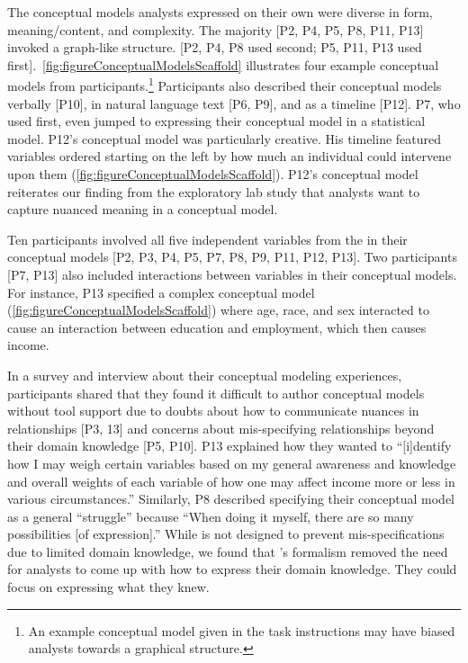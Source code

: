 The conceptual models analysts expressed on their own were diverse in form,
meaning/content, and complexity. The majority [P2, P4, P5, P8, P11, P13] invoked
a graph-like structure. [P2, P4, P8 used \rTisane second; P5, P11, P13 used
\rTisane first].~\autoref{fig:figureConceptualModelsScaffold} illustrates four example conceptual
models from participants.\footnote{An example conceptual model given in the task instructions may
have biased analysts towards a graphical structure.} Participants also described
their conceptual models verbally [P10], in natural language text [P6, P9], and
as a timeline [P12]. P7, who used \rTisane first, even jumped to expressing
their conceptual model in a statistical model. P12's conceptual model was
particularly creative. His timeline featured variables ordered starting on the
left by how much an individual could intervene upon them (\autoref{fig:figureConceptualModelsScaffold}). P12's conceptual model reiterates our finding from the exploratory lab
study that analysts want to capture nuanced meaning in a conceptual model. 

Ten participants involved all five independent variables from the \dataSet in
their conceptual models [P2, P3, P4, P5, P7, P8, P9, P11, P12, P13]. Two
participants [P7, P13] also included interactions between variables in their
conceptual models. For instance, P13 specified a complex conceptual model
(\autoref{fig:figureConceptualModelsScaffold}) where age, race, and sex interacted to cause an
interaction between education and employment, which then causes income.

In a survey and interview about their conceptual modeling experiences,
participants shared that they found it difficult to author conceptual models
without tool support due to doubts about how to communicate nuances in
relationships [P3, 13] and concerns about mis-specifying relationships beyond
their domain knowledge [P5, P10]. P13 explained how they wanted to ``[i]dentify
how I may weigh certain variables based on my general awareness and knowledge
and overall weights of each variable of how one may affect income more or less
in various circumstances.'' Similarly, P8 described specifying their conceptual
model as a general ``struggle'' because ``When doing it myself, there are so
many possibilities [of expression].'' While \rTisane is not designed to prevent
mis-specifications due to limited domain knowledge, we found that \rTisane's
formalism removed the need for analysts to come up with how to express their
domain knowledge. They could focus on expressing what they knew. 

